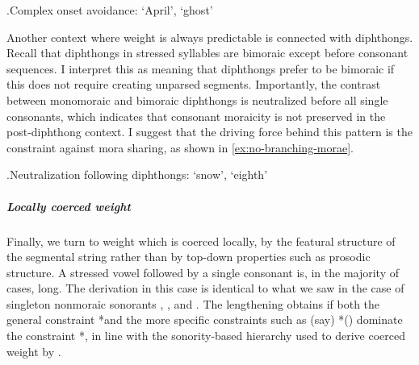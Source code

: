\ex.\label{ex:pw-ebrill-tableau}Complex onset avoidance: \ipa{[ˈebriɬ]} `April', \ipa{[ˈəsprid]} `ghost'\\
\begin{OTmultitableau}{4}
\end{OTmultitableau}

Another context where weight is always predictable is connected with diphthongs. Recall that diphthongs in stressed syllables are bimoraic except before consonant sequences. I interpret this as meaning that diphthongs prefer to be bimoraic if this does not require creating unparsed segments. Importantly, the contrast between monomoraic and bimoraic diphthongs is neutralized before all single consonants, which indicates that consonant moraicity is not preserved in the post\hyp diphthong context. I suggest that the driving force behind this pattern is the constraint against mora sharing, as shown in \ref{ex:no-branching-morae}.

\ex.\label{ex:no-branching-morae}Neutralization following diphthongs: \ipa{[ˈeira]} `snow', \ipa{[ˈuiθved]} `eighth'\\

\subparagraph{Locally coerced weight}
\label{sec:locally-coerc-weight}


Finally, we turn to weight which is coerced locally, \ie by the featural structure of the segmental string rather than by top-down properties such as prosodic structure. A stressed vowel followed by a single consonant is, in the majority of cases, long. The derivation in this case is identical to what we saw in the case of singleton nonmoraic sonorants \ipa{[n]}, \ipa{[l]}, and \ipa{[r]}. The lengthening obtains if both the general constraint *\mo[C] and the more specific constraints such as (say) *\mo() dominate the constraint *\mo[V], in line with the sonority-based hierarchy used to derive coerced weight by \eg \citet{moren00:_kashm,moren01:_distin}.

